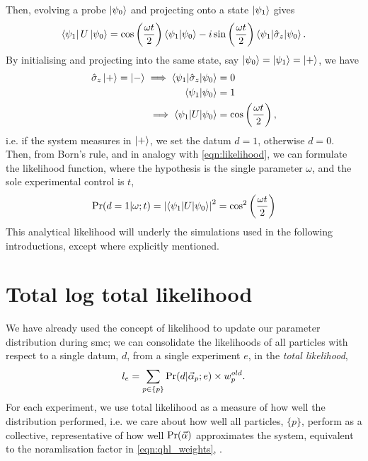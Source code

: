 Then, evolving a \gls{probe} $\ket{\psi_0}$ and projecting onto a state $\ket{\psi_1}$ gives
\begin{equation}
    \label{eqn:rabi_projection}
    \bra{\psi_1} U \ket{\psi_0} = \cos\left(\frac{\omega t}{2}\right) \braket{\psi_1 | \psi_0} - i \sin\left(\frac{\omega t}{2}\right) \braket{ \psi_1 | \hat{\sigma}_z | \psi_0}.
\end{equation}
By initialising and projecting into the same state, say $\ket{\psi_0} = \ket{\psi_1} = \ket{+}$, we have
\begin{align}
    \begin{split}
        \hat{\sigma}_z\ket{+} = \ket{-} \implies \braket{\psi_1 | \hat{\sigma}_z | \psi_0} &= 0 \\
        \braket{\psi_1 | \psi_0} &= 1 \\
        \implies \braket{\psi_1 |  U | \psi_0} &= \cos\left(\frac{\omega t}{2}\right),
    \end{split}
\end{align}
    i.e. if the system measures in $\ket{+}$, we set the datum $d=1$, otherwise $d=0$. 
Then, from Born's rule, and in analogy with \cref{eqn:likelihood}, we can formulate the likelihood function, 
    where the hypothesis is the single parameter $\omega$, and the sole experimental control is $t$, 
\begin{equation}
    \label{eqn:analytical_likleihood}
    \Pr(d=1 | \omega; t) = \left| \braket{\psi_1 |  U | \psi_0} \right|^2 = \cos^2\left(\frac{\omega t}{2}\right)
\end{equation}
This analytical likelihood will underly the simulations used in the following introductions, except where explicitly mentioned. 

\section{Total log total likelihood}\label{sec:total_log_total_likelihood}
We have already used the concept of \gls{likelihood} to update our parameter distribution during \gls{smc}; 
    we can consolidate the likelihoods of all particles with respect to a single datum, $d$, from a single experiment $e$,  
    in the \emph{total likelihood}, 
    \begin{equation}
        \label{eqn:total_likelihood}
        l_{e} = \sum\limits_{p \in \{p\}} \Pr(d | \vec{\alpha}_p ; e) \times w_p^{old}.
    \end{equation}
For each experiment, we use total likelihood as a measure of how well the distribution performed,
    i.e. we care about how well all particles, $\{p\}$, perform as a collective, representative of how well $\Pr(\vec{\alpha})$ approximates the system,
    equivalent to the noramlisation factor in \cref{eqn:qhl_weights}, \cite{granade2015characterizationp92}. 

